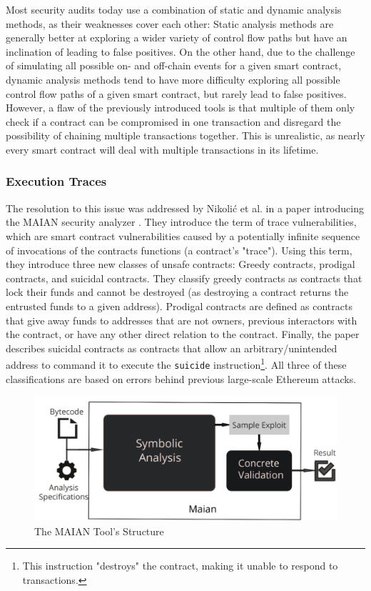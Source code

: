 \documentclass[letterpaper,twocolumn,10pt]{article}
\begin{document}
Most security audits today use a combination of static and dynamic analysis methods, as their weaknesses cover each other: Static analysis methods are generally better at exploring a wider variety of control flow paths but have an inclination of leading to false positives. On the other hand, due to the challenge of simulating all possible on- and off-chain events for a given smart contract, dynamic analysis methods tend to have more difficulty exploring all possible control flow paths of a given smart contract, but rarely lead to false positives. However, a flaw of the previously introduced tools is that multiple of them only check if a contract can be compromised in one transaction and disregard the possibility of chaining multiple transactions together. This is unrealistic, as nearly every smart contract will deal with multiple transactions in its lifetime.

\subsubsection{Execution Traces}
\label{subsection:trace}
The resolution to this issue was addressed by Nikolić et al. in a paper introducing the MAIAN security analyzer \cite{nikolic_kolluri_sergey_saxena_hobor_2018}. They introduce the term of trace vulnerabilities, which are smart contract vulnerabilities caused by a potentially infinite sequence of invocations of the contracts functions (a contract's "trace"). Using this term, they introduce three new classes of unsafe contracts: Greedy contracts, prodigal contracts, and suicidal contracts. They classify greedy contracts as contracts that lock their funds and cannot be destroyed (as destroying a contract returns the entrusted funds to a given address). Prodigal contracts are defined as contracts that give away funds to addresses that are not owners, previous interactors with the contract, or have any other direct relation to the contract. Finally, the paper describes suicidal contracts as contracts that allow an arbitrary/unintended address to command it to execute the \verb|suicide| instruction\footnote{This instruction "destroys" the contract, making it unable to respond to transactions.}. All three of these classifications are based on errors behind previous large-scale Ethereum attacks.

\begin{figure}
\begin{center}
\includegraphics[scale=0.2]{MAIAN}
\end{center}
\caption{\label{fig:maian} The MAIAN Tool's Structure\cite{nikolic_kolluri_sergey_saxena_hobor_2018}}
\end{figure}
\end{document}
